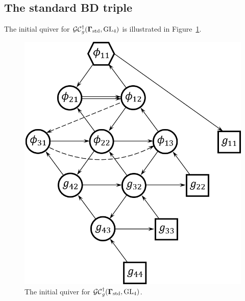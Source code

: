 \subsection{The standard BD triple}
The initial quiver for $\mathcal{GC}_g^{\dagger}(\mathbf{\Gamma}_{\text{std}},\operatorname{GL}_4)$ is illustrated in Figure~\ref{f:ex_n=4gstd}.

\begin{figure}[htb]
\begin{center}
\includegraphics[scale=0.65]{g_convention/g_n=4_std.png}
\end{center}
\caption{The initial quiver for $\mathcal{GC}^{\dagger}_g(\mathbf{\Gamma}_{\text{std}},\operatorname{GL}_4)$.}
\label{f:ex_n=4gstd}
\end{figure}

